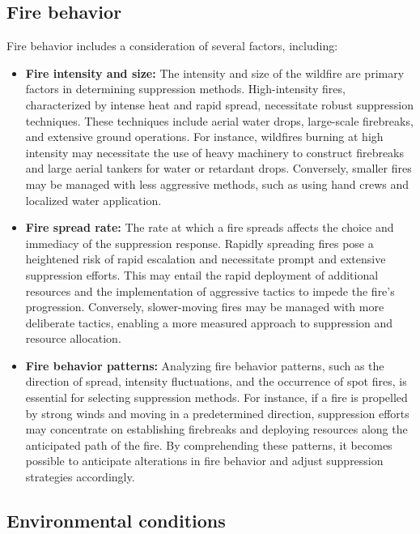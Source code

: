 \documentclass[
  12 pt,
]{Nemilov}
\begin{document}
\subsection{Fire behavior}\label{fire-behavior}

Fire behavior includes a consideration of several factors, including:

\begin{itemize}
\item
  \textbf{Fire intensity and size:} The intensity and size of the wildfire are primary factors in determining suppression methods. High-intensity fires, characterized by intense heat and rapid spread, necessitate robust suppression techniques. These techniques include aerial water drops, large-scale firebreaks, and extensive ground operations. For instance, wildfires burning at high intensity may necessitate the use of heavy machinery to construct firebreaks and large aerial tankers for water or retardant drops. Conversely, smaller fires may be managed with less aggressive methods, such as using hand crews and localized water application.
\item
  \textbf{Fire spread rate:} The rate at which a fire spreads affects the choice and immediacy of the suppression response. Rapidly spreading fires pose a heightened risk of rapid escalation and necessitate prompt and extensive suppression efforts. This may entail the rapid deployment of additional resources and the implementation of aggressive tactics to impede the fire's progression. Conversely, slower-moving fires may be managed with more deliberate tactics, enabling a more measured approach to suppression and resource allocation.
\item
  \textbf{Fire behavior patterns:} Analyzing fire behavior patterns, such as the direction of spread, intensity fluctuations, and the occurrence of spot fires, is essential for selecting suppression methods. For instance, if a fire is propelled by strong winds and moving in a predetermined direction, suppression efforts may concentrate on establishing firebreaks and deploying resources along the anticipated path of the fire. By comprehending these patterns, it becomes possible to anticipate alterations in fire behavior and adjust suppression strategies accordingly.
\end{itemize}

\subsection{Environmental conditions}\label{environmental-conditions}
\end{document}
